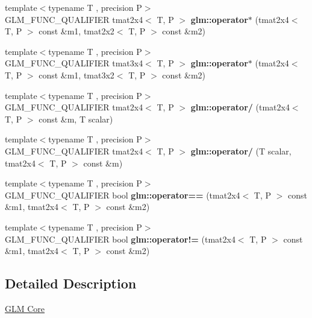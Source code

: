 \begin{DoxyCompactItemize}
\item 
\mbox{\label{type__mat2x4_8inl_a6e95f7bb50c470a281e61d84895675d4}} 
{\footnotesize template$<$typename T , precision P$>$ }\\G\+L\+M\+\_\+\+F\+U\+N\+C\+\_\+\+Q\+U\+A\+L\+I\+F\+I\+ER tmat2x4$<$ T, P $>$ {\bfseries glm\+::operator$\ast$} (tmat2x4$<$ T, P $>$ const \&m1, tmat2x2$<$ T, P $>$ const \&m2)
\item 
\mbox{\label{type__mat2x4_8inl_a74224d12bdf4aebfe9005cf41e80ef7c}} 
{\footnotesize template$<$typename T , precision P$>$ }\\G\+L\+M\+\_\+\+F\+U\+N\+C\+\_\+\+Q\+U\+A\+L\+I\+F\+I\+ER tmat3x4$<$ T, P $>$ {\bfseries glm\+::operator$\ast$} (tmat2x4$<$ T, P $>$ const \&m1, tmat3x2$<$ T, P $>$ const \&m2)
\item 
\mbox{\label{type__mat2x4_8inl_a92780a43038bd1a664552a3886e0f353}} 
{\footnotesize template$<$typename T , precision P$>$ }\\G\+L\+M\+\_\+\+F\+U\+N\+C\+\_\+\+Q\+U\+A\+L\+I\+F\+I\+ER tmat2x4$<$ T, P $>$ {\bfseries glm\+::operator/} (tmat2x4$<$ T, P $>$ const \&m, T scalar)
\item 
\mbox{\label{type__mat2x4_8inl_a47d50cf64981755097cb147a1742a257}} 
{\footnotesize template$<$typename T , precision P$>$ }\\G\+L\+M\+\_\+\+F\+U\+N\+C\+\_\+\+Q\+U\+A\+L\+I\+F\+I\+ER tmat2x4$<$ T, P $>$ {\bfseries glm\+::operator/} (T scalar, tmat2x4$<$ T, P $>$ const \&m)
\item 
\mbox{\label{type__mat2x4_8inl_acf9efbc338894088f7ca5419c6a0cf81}} 
{\footnotesize template$<$typename T , precision P$>$ }\\G\+L\+M\+\_\+\+F\+U\+N\+C\+\_\+\+Q\+U\+A\+L\+I\+F\+I\+ER bool {\bfseries glm\+::operator==} (tmat2x4$<$ T, P $>$ const \&m1, tmat2x4$<$ T, P $>$ const \&m2)
\item 
\mbox{\label{type__mat2x4_8inl_a979ffc34e33d3dd7ca8375b30c021384}} 
{\footnotesize template$<$typename T , precision P$>$ }\\G\+L\+M\+\_\+\+F\+U\+N\+C\+\_\+\+Q\+U\+A\+L\+I\+F\+I\+ER bool {\bfseries glm\+::operator!=} (tmat2x4$<$ T, P $>$ const \&m1, tmat2x4$<$ T, P $>$ const \&m2)
\end{DoxyCompactItemize}


\subsection{Detailed Description}
\hyperlink{group__core}{G\+LM Core} 